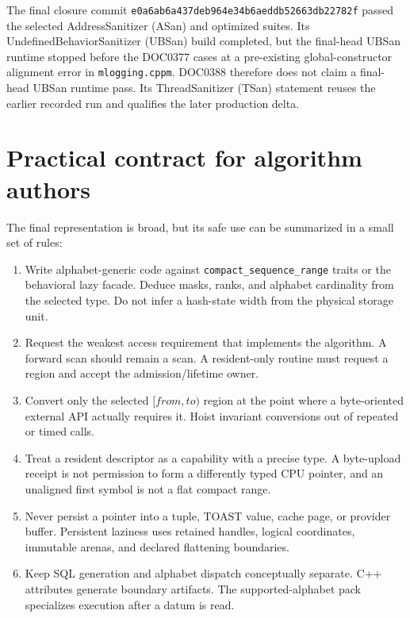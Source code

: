 The final closure commit
\texttt{e0a6ab6a437deb964e34b6aeddb52663db22782f} passed the selected
AddressSanitizer (ASan) and optimized suites.  Its
UndefinedBehaviorSanitizer (UBSan) build completed, but the final-head UBSan
runtime stopped before the DOC0377 cases at a pre-existing global-constructor
alignment error in \texttt{mlogging.cppm}.  DOC0388 therefore does not claim a
final-head UBSan runtime pass.  Its ThreadSanitizer (TSan) statement reuses the
earlier recorded run and qualifies the later production delta.

\section{Practical contract for algorithm authors}
\label{sec:sequence-author-contract}

The final representation is broad, but its safe use can be summarized in a
small set of rules:

\begin{enumerate}
    \item Write alphabet-generic code against
    \texttt{compact\_sequence\_range} traits or the behavioral lazy facade.
    Deduce masks, ranks, and alphabet cardinality from the selected type.
    Do not infer a hash-state width from the physical storage unit.
    \item Request the weakest access requirement that implements the
    algorithm.  A forward scan should remain a scan.  A resident-only routine
    must request a region and accept the admission/lifetime owner.
    \item Convert only the selected \([from,to)\) region at the point where a
    byte-oriented external API actually requires it.  Hoist invariant
    conversions out of repeated or timed calls.
    \item Treat a resident descriptor as a capability with a precise type.
    A byte-upload receipt is not permission to form a differently typed CPU
    pointer, and an unaligned first symbol is not a flat compact range.
    \item Never persist a pointer into a tuple, TOAST value, cache page, or
    provider buffer.  Persistent laziness uses retained handles, logical
    coordinates, immutable arenas, and declared flattening boundaries.
    \item Keep SQL generation and alphabet dispatch conceptually separate.
    C++ attributes generate boundary artifacts.  The supported-alphabet pack
    specializes execution after a datum is read.
\end{enumerate}

